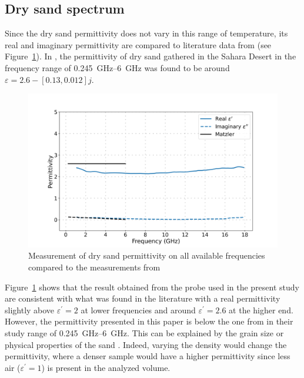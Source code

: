 \subsection{Dry sand spectrum}
Since the dry sand permittivity does not vary in this range of temperature, its real and imaginary permittivity are compared to literature data from \textcite{Matzler1998} (see Figure~\ref{fig:dry-sand}).
In \parencite{Matzler1998}, the permittivity of dry sand gathered in the Sahara Desert in the frequency range of \qtyrange{0.245}{6}{\giga\hertz} was found to be around \(\varepsilon = 2.6 - \left[0.13, 0.012\right]j\).

\begin{figure}[ht!]
    \centering
    \includegraphics[width=\columnwidth]{Images/dry-sand.png}
    \caption[]{Measurement of dry sand permittivity on all available frequencies compared to the measurements from \textcite{Matzler1998}}\label{fig:dry-sand}
\end{figure}

Figure~\ref{fig:dry-sand} shows that the result obtained from the probe used in the present study are consistent with what was found in the literature with a real permittivity slightly above \(\varepsilon^\prime = 2\) at lower frequencies and around \(\varepsilon^\prime = 2.6\) at the higher end.
However, the permittivity presented in this paper is below the one from \textcite{Matzler1998} in their study range of \qtyrange{0.245}{6}{\giga\hertz}.
This can be explained by the grain size or physical properties of the sand \parencite{Schmugge1980}.
Indeed, varying the density would change the permittivity, where a denser sample would have a higher permittivity since less air (\(\varepsilon^\prime = 1\)) is present in the analyzed volume. 

